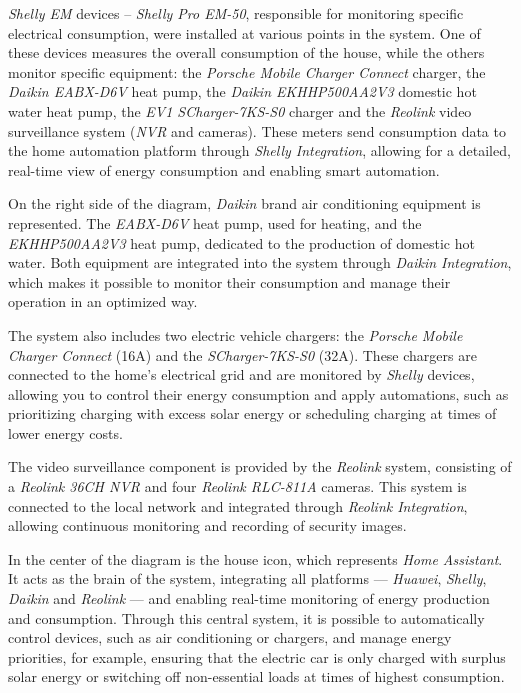 \documentclass[graybox]{svmult}
\begin{document}
\textit{Shelly EM} devices – \textit{Shelly Pro EM-50}, responsible for monitoring specific electrical consumption, were installed at various points in the system. One of these devices measures the overall consumption of the house, while the others monitor specific equipment: the \textit{Porsche Mobile Charger Connect} charger, the \textit{Daikin EABX-D6V} heat pump, the \textit{Daikin EKHHP500AA2V3} domestic hot water heat pump, the \textit{EV1 SCharger-7KS-S0} charger and the \textit{Reolink} video surveillance system (\textit{NVR} and cameras). These meters send consumption data to the home automation platform through \textit{Shelly Integration}, allowing for a detailed, real-time view of energy consumption and enabling smart automation.

On the right side of the diagram, \textit{Daikin} brand air conditioning equipment is represented. The \textit{EABX-D6V} heat pump, used for heating, and the \textit{EKHHP500AA2V3} heat pump, dedicated to the production of domestic hot water. Both equipment are integrated into the system through \textit{Daikin Integration}, which makes it possible to monitor their consumption and manage their operation in an optimized way.

The system also includes two electric vehicle chargers: the \textit{Porsche Mobile Charger Connect} (16A) and the \textit{SCharger-7KS-S0} (32A). These chargers are connected to the home's electrical grid and are monitored by \textit{Shelly} devices, allowing you to control their energy consumption and apply automations, such as prioritizing charging with excess solar energy or scheduling charging at times of lower energy costs.

The video surveillance component is provided by the \textit{Reolink} system, consisting of a \textit{Reolink 36CH NVR} and four \textit{Reolink RLC-811A} cameras. This system is connected to the local network and integrated through \textit{Reolink Integration}, allowing continuous monitoring and recording of security images.

In the center of the diagram is the house icon, which represents \textit{Home Assistant}.  
It acts as the brain of the system, integrating all platforms — \textit{Huawei}, \textit{Shelly}, \textit{Daikin} and \textit{Reolink} — and enabling real-time monitoring of energy production and consumption. Through this central system, it is possible to automatically control devices, such as air conditioning or chargers, and manage energy priorities, for example, ensuring that the electric car is only charged with surplus solar energy or switching off non-essential loads at times of highest consumption.
\end{document}
